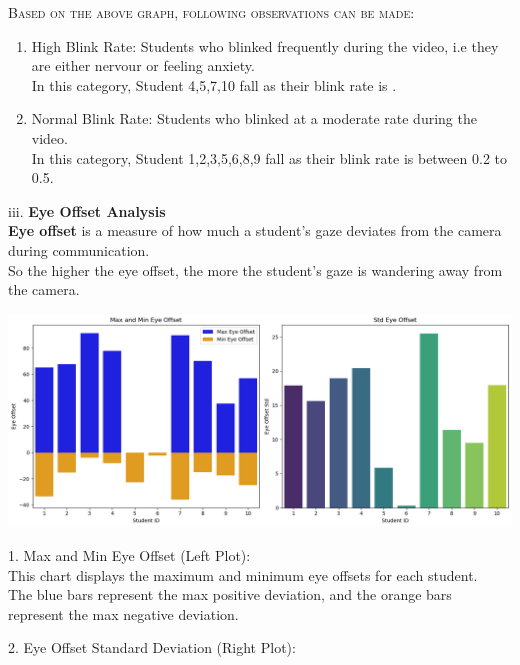\documentclass{article}
\begin{document}
\textsc{Based on the above graph, following observations can be made:}

\begin{enumerate}
    \item High Blink Rate: Students who blinked frequently during the video, i.e they are either nervour or feeling anxiety.\\
    {
        In this category, Student 4,5,7,10 fall as their blink rate is .
    }
    \item Normal Blink Rate: Students who blinked at a moderate rate during the video.\\
    {
        In this category, Student 1,2,3,5,6,8,9 fall as their blink rate is between 0.2 to 0.5.
    }
\end{enumerate}

\vspace{0.3in}
iii. \textbf{Eye Offset Analysis}\\

\textbf{Eye offset} is a measure of how much a student's gaze deviates from the camera during communication.\\
So the higher the eye offset, the more the student's gaze is wandering away from the camera.\\

\begin{center}
    \includegraphics[width=1\columnwidth]{images/eye_offset.png}
\end{center}

1. Max and Min Eye Offset (Left Plot):\\

This chart displays the maximum and minimum eye offsets for each student.\\
The blue bars represent the max positive deviation, and the orange bars represent the max negative deviation.

\vspace{0.1in}

2. Eye Offset Standard Deviation (Right Plot):\\
\end{document}
